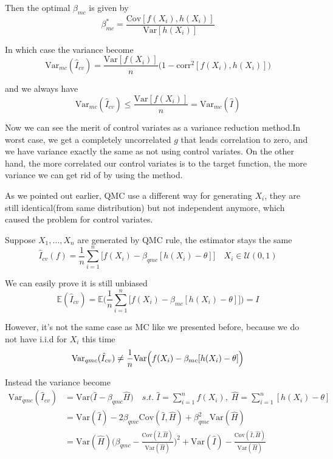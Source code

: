 Then the optimal $\beta_{mc}$ is given by 
\begin{equation}
    \beta_{mc}^*=\frac{\mathrm{Cov}[f(X_i),h(X_i)]}{\mathrm{Var}[h(X_i)]}
    \label{eq:optBeta}
\end{equation}

In which case the variance become
\[
    \mathrm{Var}_{mc}(\hat{I}_{cv})= \frac{\mathrm{Var}[f(X_i)]}{n}\big(1-\mathrm{corr}^2[f(X_i), h(X_i)]\big) 
\]

and we always have 
\[
\mathrm{Var}_{mc}(\hat{I}_{cv}) \leq \frac{\mathrm{Var}[f(X_i)]}{n}=\mathrm{Var}_{mc}(\hat{I})
\]

Now we can see the merit of control variates as a variance reduction method.In worst case, we get a completely uncorrelated $g$ that leads correlation to zero, and we have variance exactly the same as not using control variates. On the other hand, the more correlated our control variates is to the target function, the more variance we can get rid of by using the method.

As we pointed out earlier, QMC use a different way for generating $X_i$, they are still identical(from same distribution) but not independent anymore, which caused the problem for control variates.

Suppose $X_1, \dots, X_n$ are generated by QMC rule, the estimator stays the same
\[
    \hat{I}_{cv}(f)=\frac{1}{n}\sum_{i=1}^{n}\Big[ f(X_i)-\beta_{qmc}[h(X_i)-\theta] \Big] \quad X_i\in \mathcal{U}(0,1)
\]

We can easily prove it is still unbiased
\[
\mathbb{E}(\hat{I}_{cv})=\mathbb{E}\Big(\frac{1}{n}\sum_{i=1}^{n}\Big[f(X_i)-\beta_{mc}[h(X_i)-\theta] \Big] \Big)=I 
\]

However, it's not the same case as MC like we presented before, because we do not have i.i.d for $X_i$ this time
\[
\mathrm{Var}_{qmc}(\hat{I}_{cv}) \not=\frac{1}{n}\mathrm{Var}\Big(f(X_i)-\beta_{mc}[h(X_i)-\theta]\Big)\\
\]

Instead the variance become
\begin{align*}
    \mathrm{Var}_{qmc}(\hat{I}_{cv})  
    &=\mathrm{Var}\Big( \hat{I}- \beta_{qmc}\hat{H}\Big)
    \quad s.t.\; \hat{I}=\sum_{i=1}^{n}f(X_i),\; \hat{H}=\sum_{i=1}^{n}[h(X_i)-\theta]\\
    &=\mathrm{Var}(\hat{I})-2\beta_{qmc}\mathrm{Cov}(\hat{I},\hat{H})+\beta_{qmc}^2\mathrm{Var}(\hat{H})\\
    &=\mathrm{Var}(\hat{H})\Big(\beta_{qmc}-\frac{\mathrm{Cov}(\hat{I},\hat{H})}{\mathrm{Var}(\hat{H})}\Big)^2+\mathrm{Var}(\hat{I})-\frac{\mathrm{Cov}(\hat{I},\hat{H})}{\mathrm{Var}(\hat{H})}
\end{align*}

